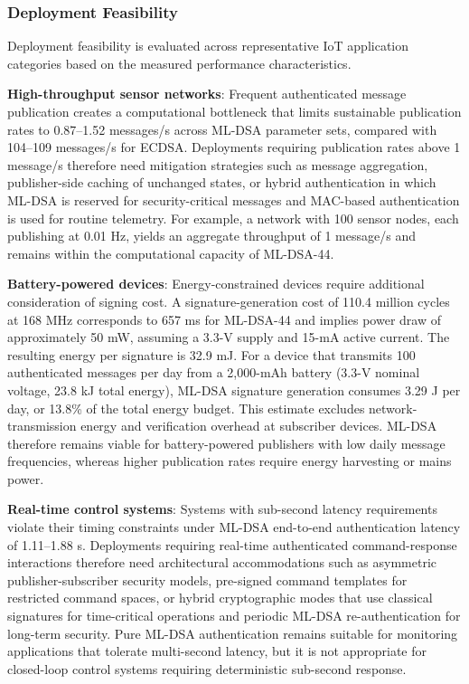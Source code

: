 \documentclass[final, twoside]{IEEEtran} %
\begin{document}
\subsubsection{Deployment Feasibility}

Deployment feasibility is evaluated across representative IoT application categories based on the measured performance characteristics.

\textbf{High-throughput sensor networks}: Frequent authenticated message publication creates a computational bottleneck that limits sustainable publication rates to 0.87--1.52 messages/s across ML-DSA parameter sets, compared with 104--109 messages/s for ECDSA. Deployments requiring publication rates above 1 message/s therefore need mitigation strategies such as message aggregation, publisher-side caching of unchanged states, or hybrid authentication in which ML-DSA is reserved for security-critical messages and MAC-based authentication is used for routine telemetry. For example, a network with 100 sensor nodes, each publishing at 0.01 Hz, yields an aggregate throughput of 1 message/s and remains within the computational capacity of ML-DSA-44.

\textbf{Battery-powered devices}: Energy-constrained devices require additional consideration of signing cost. A signature-generation cost of 110.4 million cycles at 168 MHz corresponds to 657 ms for ML-DSA-44 and implies power draw of approximately 50 mW, assuming a 3.3-V supply and 15-mA active current. The resulting energy per signature is 32.9 mJ. For a device that transmits 100 authenticated messages per day from a 2,000-mAh battery (3.3-V nominal voltage, 23.8 kJ total energy), ML-DSA signature generation consumes 3.29 J per day, or 13.8\% of the total energy budget. This estimate excludes network-transmission energy and verification overhead at subscriber devices. ML-DSA therefore remains viable for battery-powered publishers with low daily message frequencies, whereas higher publication rates require energy harvesting or mains power.

\textbf{Real-time control systems}: Systems with sub-second latency requirements violate their timing constraints under ML-DSA end-to-end authentication latency of 1.11--1.88 s. Deployments requiring real-time authenticated command-response interactions therefore need architectural accommodations such as asymmetric publisher-subscriber security models, pre-signed command templates for restricted command spaces, or hybrid cryptographic modes that use classical signatures for time-critical operations and periodic ML-DSA re-authentication for long-term security. Pure ML-DSA authentication remains suitable for monitoring applications that tolerate multi-second latency, but it is not appropriate for closed-loop control systems requiring deterministic sub-second response.
\end{document}
